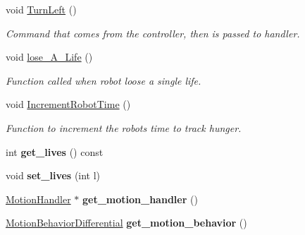 \begin{DoxyCompactItemize}
\mbox{\label{class_robot_ad864d21d997dbadf55f997c2f0143d41}} 
void \mbox{\hyperlink{class_robot_ad864d21d997dbadf55f997c2f0143d41}{Turn\+Left}} ()
\begin{DoxyCompactList}\small\item\em Command that comes from the controller, then is passed to handler. \end{DoxyCompactList}\item 
\mbox{\label{class_robot_ae0a3474ce96a7edee32f1b6597308d80}} 
void \mbox{\hyperlink{class_robot_ae0a3474ce96a7edee32f1b6597308d80}{lose\+\_\+\+A\+\_\+\+Life}} ()
\begin{DoxyCompactList}\small\item\em Function called when robot loose a single life. \end{DoxyCompactList}\item 
\mbox{\label{class_robot_ad71cb8a7785ec61e938b62d1eb85c70e}} 
void \mbox{\hyperlink{class_robot_ad71cb8a7785ec61e938b62d1eb85c70e}{Increment\+Robot\+Time}} ()
\begin{DoxyCompactList}\small\item\em Function to increment the robots time to track hunger. \end{DoxyCompactList}\item 
\mbox{\label{class_robot_a8cc04d2b9504a489dbaf441a0cb56b9a}} 
int {\bfseries get\+\_\+lives} () const
\item 
\mbox{\label{class_robot_a8823c73b258afe8cf8ef276e8f2f9aab}} 
void {\bfseries set\+\_\+lives} (int l)
\item 
\mbox{\label{class_robot_a80b6c7f15493d4b5c608d185b9a116ce}} 
\mbox{\hyperlink{class_motion_handler}{Motion\+Handler}} $\ast$ {\bfseries get\+\_\+motion\+\_\+handler} ()
\item 
\mbox{\label{class_robot_ab45bf3c6fdafcd14cdbdb2a8e3f558b8}} 
\mbox{\hyperlink{class_motion_behavior_differential}{Motion\+Behavior\+Differential}} {\bfseries get\+\_\+motion\+\_\+behavior} ()
\item 
\mbox{\label{class_robot_ac2e00bdd8bfac97d1bd89c86ee0fd727}} 

\end{DoxyCompactItemize}
